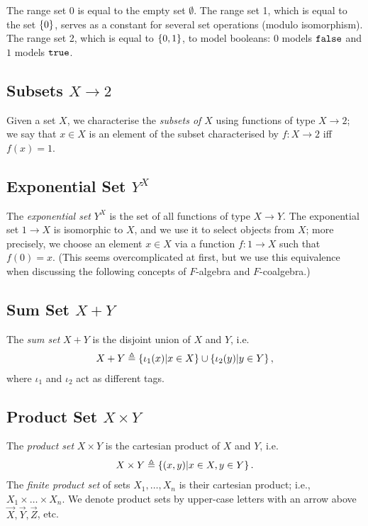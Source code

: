 The range set 0 is equal to the empty set $\emptyset$. 
The range set 1, which is equal to the set $\left\{0\right\}$, serves as a constant for several set operations (modulo isomorphism).
The range set 2, which is equal to $\left\{0,1\right\}$, to model booleans: 0 models $\mathtt{\texttt{false}}$ and $1$ models $\mathtt{\texttt{true}}$. 

\subsection{Subsets $X\rightarrow 2$}
Given a set $X$, we characterise the \emph{subsets of $X$} using functions of type $X\rightarrow 2$; we say that $x\in X$ is an element of the subset characterised by $f\colon X\rightarrow 2$ iff $f(x)=1$. 
 
\subsection{Exponential Set $Y^X$}
The \emph{exponential set} $Y^X$ is the set of all functions of type $X\rightarrow Y$. 
The exponential set $1\rightarrow X$ is isomorphic to $X$, and we use it to select objects from $X$; more precisely, we choose an element $x\in X$ via a function $f\colon 1\rightarrow X$ such that $f(0)=x$. (This seems overcomplicated at first, but we use this equivalence when discussing the following concepts of $F$-algebra and $F$-coalgebra.)

\subsection{Sum Set $X+Y$}
The \emph{sum set} $X + Y$ is the disjoint union of $X$ and $Y$, i.e. 
\begin{align*}
    X + Y\triangleq\left\{ \iota_1(x) |x\in X\right\} \cup \left\{\iota_2(y) | y\in Y\right\},
\end{align*}
where $\iota_1$ and $\iota_2$ act as different tags.
\subsection{Product Set $X\times Y$}
The \emph{product set} $X\times Y$ is the cartesian product of $X$ and $Y$, i.e. 
\begin{align*}
    X\times Y\triangleq\left\{(x,y)|x\in X, y\in Y\right\}.
\end{align*}
The \emph{finite product set} of sets $X_1, \ldots, X_n$ is their cartesian product; i.e., $X_1\times \ldots \times X_n$. We denote product sets by upper-case letters with an arrow above $\vec{X},\vec{Y}, \vec{Z}$, etc.
